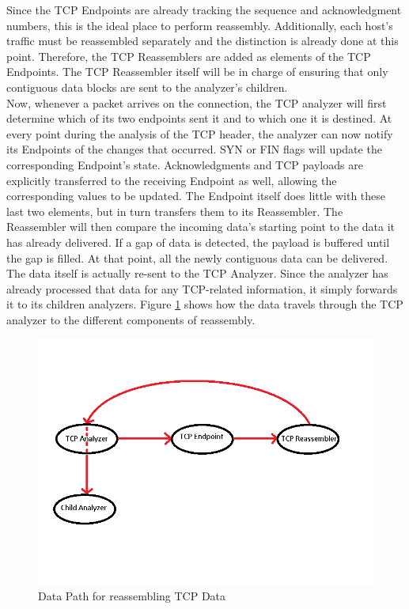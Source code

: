 Since the TCP Endpoints are already tracking the sequence and acknowledgment numbers, this is the ideal place to perform reassembly. Additionally, each host's traffic must be reassembled separately and the distinction is already done at this point. Therefore, the TCP Reassemblers are added as elements of the TCP Endpoints. The TCP Reassembler itself will be in charge of ensuring that only contiguous data blocks are sent to the analyzer's children. \\

Now, whenever a packet arrives on the connection, the TCP analyzer will first determine which of its two endpoints sent it and to which one it is destined. At every point during the analysis of the TCP header, the analyzer can now notify its Endpoints of the changes that occurred. SYN or FIN flags will update the corresponding Endpoint's state. Acknowledgments and TCP payloads are explicitly transferred to the receiving Endpoint as well, allowing the corresponding values to be updated. The Endpoint itself does little with these last two elements, but in turn transfers them to its Reassembler. The Reassembler will then compare the incoming data's starting point to the data it has already delivered. If a gap of data is detected, the payload is buffered until the gap is filled. At that point, all the newly contiguous data can be delivered. The data itself is actually re-sent to the TCP Analyzer. Since the analyzer has already processed that data for any TCP-related information, it simply forwards it to its children analyzers. Figure \ref{pic:reassembly_data} shows how the data travels through the TCP analyzer to the different components of reassembly.


\begin{figure}[!t]
\centering
\includegraphics[scale = 0.6]{Figures/reassemblydata.png}
\caption{Data Path for reassembling TCP Data}
\label{pic:reassembly_data}
\end{figure}